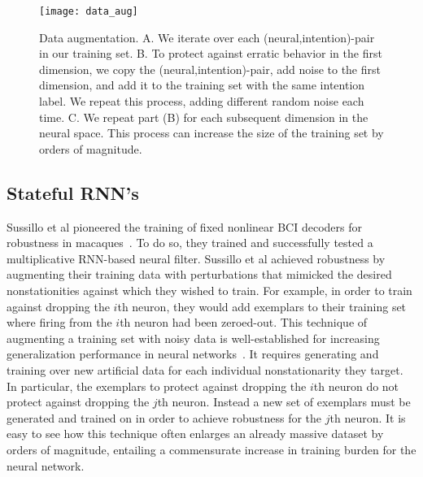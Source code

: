 \begin{figure}[h]
\begin{minipage}[c]{.49\textwidth}
\caption[Data Augmentation]{Data augmentation. A. We iterate over each (neural,intention)-pair in our training set.  B. To protect against erratic behavior in the first dimension, we copy the (neural,intention)-pair, add noise to the first dimension, and add it to the training set with the same intention label.  We repeat this process, adding different random noise each time.  C. We repeat part (B) for each subsequent dimension in the neural space.  This process can increase the size of the training set by orders of magnitude.}
\end{minipage}
\hfill
\begin{minipage}[c]{.49\textwidth}
\texttt{[image: data\_aug]}
\end{minipage}
\end{figure}

\subsection{Stateful RNN's} 
Sussillo et al pioneered the training of fixed nonlinear BCI decoders for robustness in macaques~\cite{Sus16}.  To do so, they trained and successfully tested a multiplicative RNN-based neural filter.  Sussillo et al achieved robustness by augmenting their training data with perturbations that mimicked the desired nonstationities against which they wished to train.  For example, in order to train against dropping the $i$th neuron, they would add exemplars to their training set where firing from the $i$th neuron had been zeroed-out.  This technique of augmenting a training set with noisy data is well-established for increasing generalization performance in neural networks~\cite{An96}.  It requires generating and training over new artificial data for each individual nonstationarity they target.  In particular, the exemplars to protect against dropping the $i$th neuron do not protect against dropping the $j$th neuron.  Instead a new set of exemplars must be generated and trained on in order to achieve robustness for the $j$th neuron.  It is easy to see how this technique often enlarges an already massive dataset by orders of magnitude, entailing a commensurate increase in training burden for the neural network.


